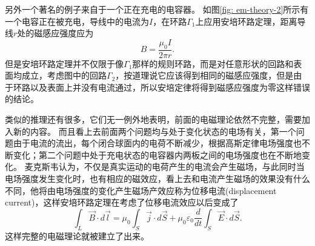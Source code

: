 另外一个著名的例子来自于一个正在充电的电容器。
如图\ref{fig: em-theory-2}所示有一个电容正在被充电，导线中的电流为$I$，在环路$\Gamma_1$上应用安培环路定理，距离导线$r$处的磁感应强度应为
\begin{equation}
B = \frac{\mu_0I}{2\pi r}.
\end{equation}
但是安培环路定理并不仅限于像$\Gamma_1$那样的规则环路，而是对任意形状的回路和表面均成立，考虑图中的回路$\Gamma_2$，按道理说它应该得到相同的磁感应强度，但是由于环路以及表面上并没有电流通过，所以安培定律将得到磁感应强度为零这样错误的结论。


类似的推理还有很多，它们无一例外地表明，前面的电磁理论依然不完整，需要加入新的内容。
而且看上去前面两个问题均与处于变化状态的电场有关，第一个问题由于电流的流出，每个闭合球面内的电荷不断减少，根据高斯定律电场强度也不断变化；第二个问题中处于充电状态的电容器内两板之间的电场强度也在不断地变化。
麦克斯韦认为，不仅是真实运动的电荷产生的电流会产生磁场，与此同时当电场强度发生变化时，也有相应的磁效应，看上去和电流产生磁场的效果没有什么不同，他将由电场强度的变化产生磁场产效应称为{\heiti 位移电流}(displacement current)，这样安培环路定理在考虑了位移电流效应以后变成了
\begin{equation}
\int_L \vec{B}\cdot d\vec{l} = \mu_0\int_S \vec{j}\cdot d\vec{S} + \mu_0\varepsilon_0\frac{d}{d t }\int_S \vec{E}\cdot d\vec{S}.
\end{equation}
这样完整的电磁理论就被建立了出来。

